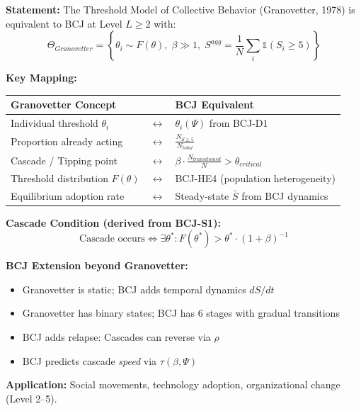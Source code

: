 \begin{tcolorbox}[colback=green!5!white, colframe=green!75!black,
    title=Theorem BCJ-T16: Granovetter Threshold Model as Special Case]
\textbf{Statement:} The Threshold Model of Collective Behavior (Granovetter, 1978) is equivalent to BCJ at Level $L \geq 2$ with:
\begin{equation}
\Theta_{Granovetter} = \left\{\theta_i \sim F(\theta), \; \beta \gg 1, \; S^{agg} = \frac{1}{N}\sum_i \mathbb{1}(S_i \geq 5)\right\}
\end{equation}

\textbf{Key Mapping:}
\begin{center}
\begin{tabular}{lcl}
\toprule
\textbf{Granovetter Concept} & & \textbf{BCJ Equivalent} \\
\midrule
Individual threshold $\theta_i$ & $\leftrightarrow$ & $\theta_i(\Psi)$ from BCJ-D1 \\
Proportion already acting & $\leftrightarrow$ & $\frac{N_{S \geq 5}}{N_{total}}$ \\
Cascade / Tipping point & $\leftrightarrow$ & $\beta \cdot \frac{N_{transitioned}}{N} > \theta_{critical}$ \\
Threshold distribution $F(\theta)$ & $\leftrightarrow$ & BCJ-HE4 (population heterogeneity) \\
Equilibrium adoption rate & $\leftrightarrow$ & Steady-state $\bar{S}$ from BCJ dynamics \\
\bottomrule
\end{tabular}
\end{center}

\textbf{Cascade Condition (derived from BCJ-S1):}
\begin{equation}
\text{Cascade occurs} \Leftrightarrow \exists \theta^* : F(\theta^*) > \theta^* \cdot (1 + \beta)^{-1}
\end{equation}

\textbf{BCJ Extension beyond Granovetter:}
\begin{itemize}[nosep]
\item Granovetter is static; BCJ adds temporal dynamics $dS/dt$
\item Granovetter has binary states; BCJ has 6 stages with gradual transitions
\item BCJ adds relapse: Cascades can reverse via $\rho$
\item BCJ predicts cascade \textit{speed} via $\tau(\beta, \Psi)$
\end{itemize}

\textbf{Application:} Social movements, technology adoption, organizational change (Level 2--5).
\end{tcolorbox}

